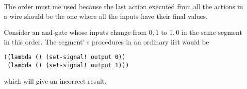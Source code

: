 \documentclass[a4paper,12pt]{article}
\begin{document}
The order must me used because the last action executed from all the
actions in a wire should be the one where all the inputs have their
final values.

Consider an and-gate whose inputs change from $0,1$ to $1,0$ in the
same segment in this order.  The segment' s  procedures in an ordinary
list would be
\begin{lstlisting}
((lambda () (set-signal! output 0))
 (lambda () (set-signal! output 1)))
\end{lstlisting}
which will give an incorrect result.
\end{document}
